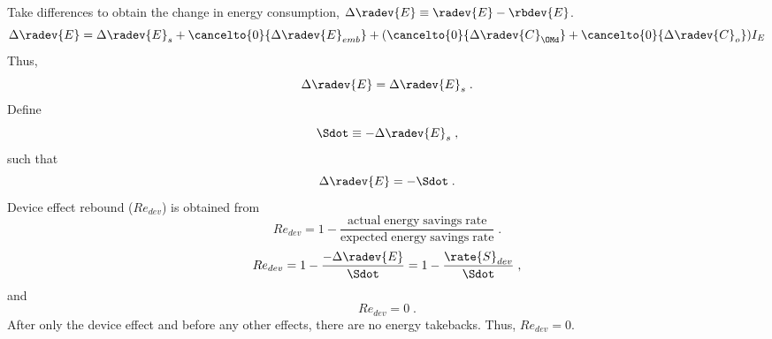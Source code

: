 \begin{landscape}
{Take differences to obtain the change in energy consumption, $\Delta \radev{E} \equiv \radev{E} - \rbdev{E}$.
%
\begin{equation}
  \Delta \radev{E} = \Delta \radev{E}_s
                     + \cancelto{0}{\Delta \radev{E}_{emb}} 
                     + (\cancelto{0}{\Delta \radev{C}_{\OMd}} 
                     + \cancelto{0}{\Delta \radev{C}_o}) I_E
\end{equation}
%
Thus, 
%
\begin{equation}
\Delta \radev{E} = \Delta \radev{E}_s \; .
\end{equation}
%
Define
%
\begin{equation} \label{eq:Sdot_def}
\Sdot \equiv -\Delta \radev{E}_s \; ,
\end{equation}
%
such that
%
\begin{equation}
\Delta \radev{E} = -\Sdot \; .
\end{equation}
%
Device effect rebound ($Re_{dev}$) is obtained from 
%
\begin{equation}
Re_{dev} = 1 - \frac{\mathrm{actual \; energy \; savings \; rate}}{\mathrm{expected \; energy \; savings \; rate}} \; .
\end{equation}
%
\begin{equation}
Re_{dev} = 1 - \frac{-\Delta \radev{E}}{\Sdot} = 1 - \frac{\rate{S}_{dev}}{\Sdot} \; ,
\end{equation}
%
and
%
\begin{equation} \label{eq:Re_dev0}
Re_{dev} = 0 \; .
\end{equation}
%
After only the device effect and before any other effects, 
there are no energy takebacks. 
Thus, $Re_{dev} = 0$.
%
}
{
~
    
}
\end{landscape}
